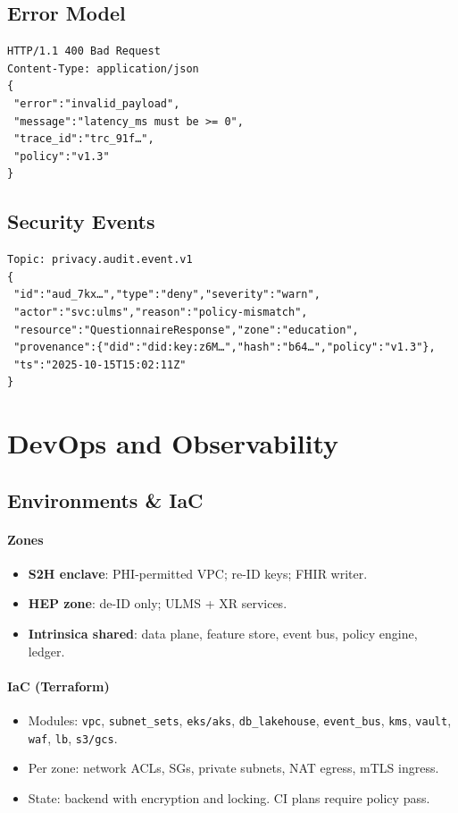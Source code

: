 \documentclass[11pt]{article}
\theoremstyle{plain}
\begin{document}
\subsection{Error Model}
\begin{verbatim}
HTTP/1.1 400 Bad Request
Content-Type: application/json
{
 "error":"invalid_payload",
 "message":"latency_ms must be >= 0",
 "trace_id":"trc_91f…",
 "policy":"v1.3"
}
\end{verbatim}

\subsection{Security Events}
\begin{verbatim}
Topic: privacy.audit.event.v1
{
 "id":"aud_7kx…","type":"deny","severity":"warn",
 "actor":"svc:ulms","reason":"policy-mismatch",
 "resource":"QuestionnaireResponse","zone":"education",
 "provenance":{"did":"did:key:z6M…","hash":"b64…","policy":"v1.3"},
 "ts":"2025-10-15T15:02:11Z"
}
\end{verbatim}

\section{DevOps and Observability}

\subsection{Environments \& IaC}
\paragraph{Zones}
\begin{itemize}
  \item \textbf{S2H enclave}: PHI-permitted VPC; re-ID keys; FHIR writer.
  \item \textbf{HEP zone}: de-ID only; ULMS + XR services.
  \item \textbf{Intrinsica shared}: data plane, feature store, event bus, policy engine, ledger.
\end{itemize}

\paragraph{IaC (Terraform)}
\begin{itemize}
  \item Modules: \texttt{vpc}, \texttt{subnet\_sets}, \texttt{eks/aks}, \texttt{db\_lakehouse}, \texttt{event\_bus}, \texttt{kms}, \texttt{vault}, \texttt{waf}, \texttt{lb}, \texttt{s3/gcs}.
  \item Per zone: network ACLs, SGs, private subnets, NAT egress, mTLS ingress.
  \item State: backend with encryption and locking. CI plans require policy pass.
\end{itemize}
\end{document}
